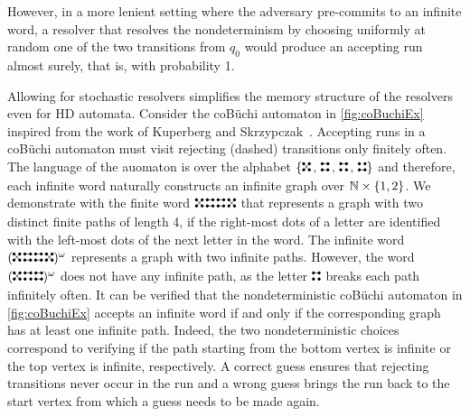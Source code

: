 However, in a more lenient setting where the adversary pre-commits to an infinite word, a resolver that resolves the nondeterminism by choosing uniformly at random one of the two transitions from $q_0$ would produce an accepting run almost surely, that is, with probability 1. 

Allowing for stochastic resolvers simplifies the memory structure of the resolvers even for HD automata. 
Consider the coB\"uchi automaton in \cref{fig:coBuchiEx} inspired from the work of Kuperberg and Skrzypczak~\cite[Theorem~1]{KS15}. Accepting runs in a coB\"uchi automaton must visit rejecting (dashed) transitions only finitely often. The language of the auomaton is over the alphabet $\{\!\!\swapletter\!,\!\sameletter\!,\!\upletter\!,\!\downletter\!\!\}$ and therefore, each infinite word naturally constructs an infinite graph over  $\mathbb{N}\times \{1,2\}$. 
We demonstrate with the finite word $\!\!\swapletter\!\!\!\sameletter\!\!\!\sameletter\!\!\!\swapletter\!\!$ that represents a graph with two distinct finite paths of length 4, if the right-most dots of a letter are identified with the left-most dots of the next letter in the word.  
The infinite word 
$(\!\!\swapletter\!\!\!\sameletter\!\!\!\sameletter\!\!\!\swapletter\!\!)^\omega$ represents a graph with two infinite paths. %
However, the word
$(\!\!\swapletter\!\!\!\upletter\!\!\!\sameletter\!\!)^\omega$ does not have any infinite path, as the letter $\!\!\upletter\!\!$ breaks each path infinitely often. %
It can be verified that the nondeterministic coB\"uchi automaton in \cref{fig:coBuchiEx} accepts an infinite word if and only if the corresponding graph has at least one infinite path.  
Indeed, the two nondeterministic choices correspond to verifying if the path starting from the bottom vertex is infinite or the top vertex is infinite, respectively. A correct guess ensures that rejecting transitions never occur in the run and a wrong guess brings the run back to the start vertex from which a guess needs to be made again. 

